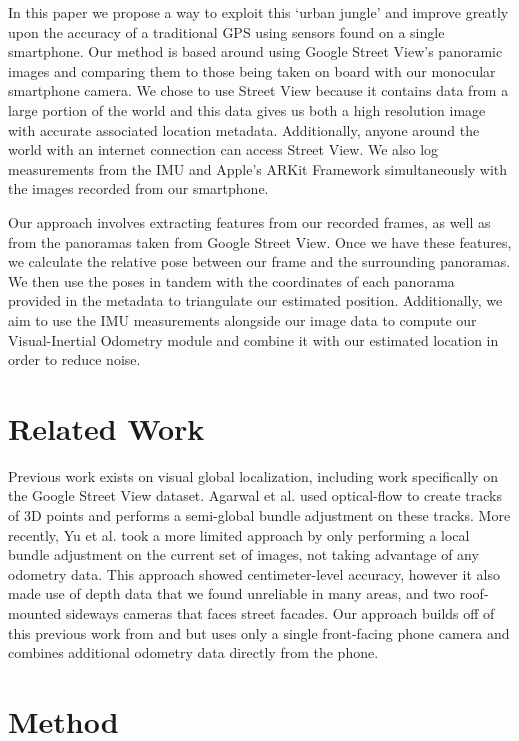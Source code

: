 \documentclass[conference]{IEEEtran}
\begin{document}
In this paper we propose a way to exploit this ‘urban jungle’ and improve greatly upon the accuracy of a traditional GPS using sensors found on a single smartphone. Our method is based around using Google Street View’s panoramic images and comparing them to those being taken on board with our monocular smartphone camera. We chose to use Street View because it contains data from a large portion of the world and this data gives us both a high resolution image with accurate associated location metadata. Additionally, anyone around the world with an internet connection can access Street View. We also log measurements from the IMU and Apple's ARKit Framework simultaneously with the images recorded from our smartphone. 

Our approach involves extracting features from our recorded frames, as well as from the panoramas taken from Google Street View. Once we have these features, we calculate the relative pose between our frame and the surrounding panoramas. We then use the poses in tandem with the coordinates of each panorama provided in the metadata to triangulate our estimated position. Additionally, we aim to use the IMU measurements alongside our image data to compute our Visual-Inertial Odometry module and combine it with our estimated location in order to reduce noise.


\section{Related Work}
Previous work exists on visual global localization, including work specifically on the Google Street View dataset. Agarwal et al. \cite{metric} used optical-flow to create tracks of 3D points and performs a semi-global bundle adjustment on these tracks. More recently, Yu et al. \cite{msthesis} took a more limited approach by only performing a local bundle adjustment on the current set of images, not taking advantage of any odometry data. This approach showed centimeter-level accuracy, however it also made use of depth data that we found unreliable in many areas, and two roof-mounted sideways cameras that faces street facades. Our approach builds off of this previous work from \cite{metric} and \cite{msthesis} but uses only a single front-facing phone camera and combines additional odometry data directly from the phone.


\section{Method}
\end{document}
